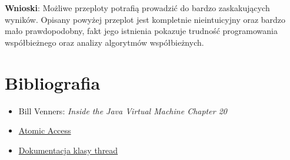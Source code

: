 \documentclass[11pt]{article}
\begin{document}
\textbf{Wnioski}: Możliwe przeploty potrafią prowadzić do bardzo zaskakujących wyników.
Opisany powyżej przeplot jest kompletnie nieintuicyjny oraz bardzo mało prawdopodobny,
fakt jego istnienia pokazuje trudność programowania współbieżnego oraz analizy
algorytmów współbieżnych.
\section*{Bibliografia}
\label{sec:org2741e60}
\begin{itemize}
\item Bill Venners: \emph{Inside the Java Virtual Machine Chapter 20}
\item \href{https://docs.oracle.com/javase/tutorial/essential/concurrency/atomic.html}{Atomic Access}
\item \href{https://download.java.net/java/early\_access/valhalla/docs/api/java.base/java/lang/Thread.html}{Dokumentacja klasy thread}
\end{itemize}
\end{document}
